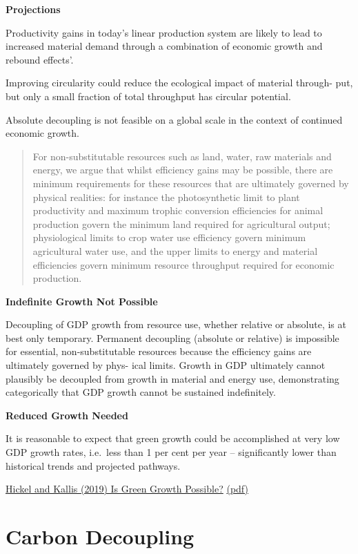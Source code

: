 \documentclass[
]{book}
\begin{document}
\textbf{Projections}

Productivity gains in today's linear production system are likely to lead to increased material
demand through a combination of economic growth and rebound effects'.

Improving circularity could reduce the ecological impact of material through-
put, but only a small fraction of total throughput has circular potential.

Absolute decoupling is not feasible on a global scale in the context of
continued economic growth.

\begin{quote}
For non-substitutable resources such as land, water, raw materials and energy, we argue that whilst efficiency
gains may be possible, there are minimum requirements for these resources that are ultimately governed by
physical realities: for instance the photosynthetic limit to plant productivity and maximum trophic conversion
efficiencies for animal production govern the minimum land required for agricultural output; physiological
limits to crop water use efficiency govern minimum agricultural water use, and the upper limits to energy and
material efficiencies govern minimum resource throughput required for economic production.
\end{quote}

\textbf{Indefinite Growth Not Possible}

Decoupling of GDP growth from resource use, whether relative or
absolute, is at best only temporary. Permanent decoupling (absolute or relative) is impossible for
essential, non-substitutable resources because the efficiency gains are ultimately governed by phys-
ical limits. Growth in GDP ultimately cannot plausibly be decoupled from growth in material and
energy use, demonstrating categorically that GDP growth cannot be sustained indefinitely.

\textbf{Reduced Growth Needed}

It is reasonable to expect that green growth
could be accomplished at very low GDP growth rates, i.e.~less than 1 per cent per year -- significantly
lower than historical trends and projected pathways.

\href{https://doi.org/10.1080/13563467.2019.1598964}{Hickel and Kallis (2019) Is Green Growth Possible?}
\href{pdf/Hickel_and_Kallis_2019_Is_Green_Growth_Possible.pdf}{(pdf)}

\hypertarget{carbon-decoupling}{%
\section{Carbon Decoupling}\label{carbon-decoupling}}
\end{document}
